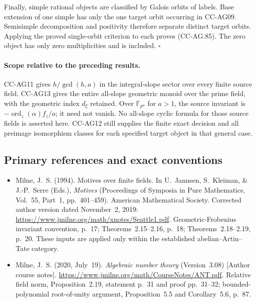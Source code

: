 Finally, simple rational objects are classified by
Galois orbits of labels.  Base extension of one simple
has only the one target orbit occurring in CC-AG09.
Semisimple decomposition and positivity therefore
separate distinct target orbits.  Applying the proved
single-orbit criterion to each proves (CC-AG.85).
The zero object has only zero multiplicities and is
included. \(\square\)

\paragraph{Scope relative to the preceding results.}
CC-AG11 gives \(h/\gcd(h,a)\) in the integral-slope sector
over every finite source field.  CC-AG13 gives the entire
all-slope geometric monoid over the prime field, with the
geometric index \(d_\xi\) retained.  Over
\(\mathbb F_{p^a}\) for \(a>1\), the source invariant is
\(-\operatorname{ord}_z(\alpha)f_z/a\); it need not vanish.
No all-slope cyclic formula for those source fields is
asserted here.  CC-AG12 still supplies the finite exact
decision and all preimage isomorphism classes for each
specified target object in that general case.

\subsection{Primary references and exact conventions}

\begin{itemize}
\item Milne, J.~S. (1994). Motives over finite fields. In
U.~Jannsen, S.~Kleiman, \& J.-P.~Serre (Eds.),
\emph{Motives} (Proceedings of Symposia in Pure Mathematics,
Vol.~55, Part~1, pp.~401--459). American Mathematical Society.
Corrected author version dated November~2, 2019:
\url{https://www.jmilne.org/math/xnotes/Seattle1.pdf}.
Geometric-Frobenius invariant convention, p.~17;
Theorems~2.15--2.16, p.~18; Theorems~2.18--2.19,
p.~20.  These inputs are applied only within the
established abelian--Artin--Tate category.
\item Milne, J.~S. (2020, July~19).
\emph{Algebraic number theory} (Version~3.08)
[Author course notes].
\url{https://www.jmilne.org/math/CourseNotes/ANT.pdf}.
Relative field norm, Proposition~2.19,
statement p.~31 and proof pp.~31--32;
bounded-polynomial root-of-unity argument,
Proposition~5.5 and Corollary~5.6, p.~87.
\end{itemize}
